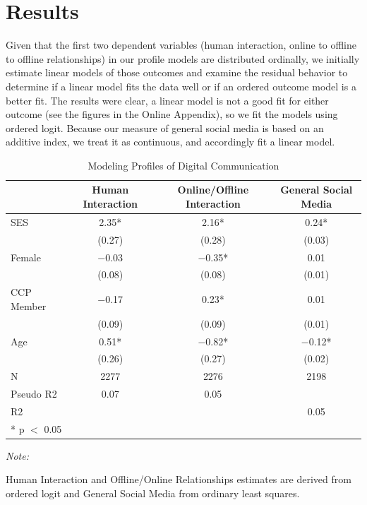 \documentclass[]{interact}
\theoremstyle{plain}%
\theoremstyle{definition}
\theoremstyle{remark}
\begin{document}
\hypertarget{results}{%
\section{Results}\label{results}}

Given that the first two dependent variables (human interaction, online
to offline to offline relationships) in our profile models are
distributed ordinally, we initially estimate linear models of those
outcomes and examine the residual behavior to determine if a linear
model fits the data well or if an ordered outcome model is a better fit.
The results were clear, a linear model is not a good fit for either
outcome (see the figures in the Online Appendix), so we fit the models
using ordered logit. Because our measure of general social media is
based on an additive index, we treat it as continuous, and accordingly
fit a linear model.

\hypertarget{tbl-profile-models}{}
\begin{table}
\caption{\label{tbl-profile-models}Modeling Profiles of Digital Communication }\tabularnewline

\centering
\begin{threeparttable}
\begin{tabular}[t]{lccc}
\toprule
  & Human Interaction & Online/Offline Interaction & General Social Media\\
\midrule
SES & \num{2.35}* & \num{2.16}* & \num{0.24}*\\
 & (\num{0.27}) & (\num{0.28}) & (\num{0.03})\\
Female & \num{-0.03} & \num{-0.35}* & \num{0.01}\\
 & (\num{0.08}) & (\num{0.08}) & (\num{0.01})\\
CCP Member & \num{-0.17} & \num{0.23}* & \num{0.01}\\
 & (\num{0.09}) & (\num{0.09}) & (\num{0.01})\\
Age & \num{0.51}* & \num{-0.82}* & \num{-0.12}*\\
 & (\num{0.26}) & (\num{0.27}) & (\num{0.02})\\
\midrule
N & \num{2277} & \num{2276} & \num{2198}\\
Pseudo R2 & \num{0.07} & \num{0.05} & \\
R2 &  &  & \num{0.05}\\
\bottomrule
\multicolumn{4}{l}{\rule{0pt}{1em}* p $<$ 0.05}\\
\end{tabular}
\begin{tablenotes}
\item \textit{Note: } 
\item Human Interaction and Offline/Online Relationships estimates are derived from ordered logit and General Social Media from ordinary least squares.
\end{tablenotes}
\end{threeparttable}
\end{table}
\end{document}
